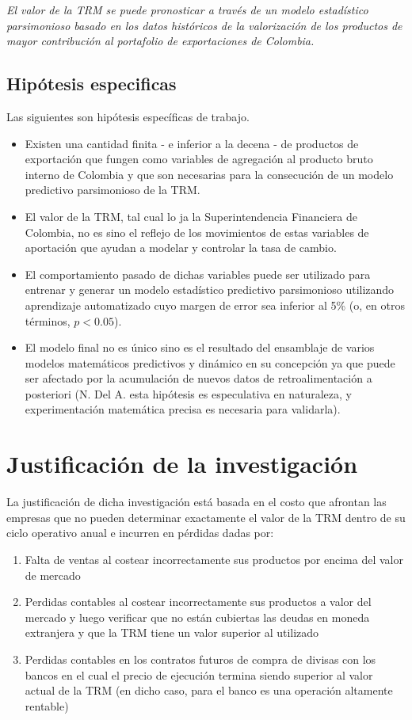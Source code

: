 \emph{El valor de la TRM se puede pronosticar a través de un modelo estadístico parsimonioso basado en los datos históricos de la valorización de los productos de mayor contribución al portafolio de exportaciones de Colombia.}

\subsection{Hipótesis especificas}
Las siguientes son hipótesis específicas de trabajo.

\begin{itemize}
	\item Existen una cantidad finita - e inferior a la decena - de productos de exportación que fungen como variables de agregación al producto bruto interno de Colombia y que son necesarias para la consecución de un modelo predictivo parsimonioso de la TRM.
	\item El valor de la TRM, tal cual lo ja la Superintendencia Financiera de Colombia, no es sino el reflejo de los movimientos de estas variables de aportación que ayudan a modelar y controlar la tasa de cambio.
	\item El comportamiento pasado de dichas variables puede ser utilizado para entrenar y generar un modelo estadístico predictivo parsimonioso utilizando aprendizaje automatizado cuyo margen de error sea inferior al 5\% (o, en otros términos, \(p < 0.05\)).
	\item El modelo final no es único sino es el resultado del ensamblaje de varios modelos matemáticos predictivos y dinámico en su concepción ya que puede ser afectado por la acumulación de nuevos datos de retroalimentación a posteriori (N. Del A. esta hipótesis es especulativa en naturaleza, y experimentación matemática precisa es necesaria para validarla).
\end{itemize}

\section{Justificación de la investigación}
La justificación de dicha investigación está basada en el costo que afrontan las empresas que no pueden determinar exactamente el valor de la TRM dentro de su ciclo operativo anual e incurren en pérdidas dadas por:

\begin{enumerate}
	\item Falta de ventas al costear incorrectamente sus productos por encima del valor de mercado
	\item Perdidas contables al costear incorrectamente sus productos a valor del mercado y luego verificar que no están cubiertas las deudas en moneda extranjera y que la TRM tiene un valor superior al utilizado
	\item Perdidas contables en los contratos futuros de compra de divisas con los bancos en el cual el precio de ejecución termina siendo superior al valor actual de la TRM (en dicho caso, para el banco es una operación altamente rentable)
\end{enumerate}

